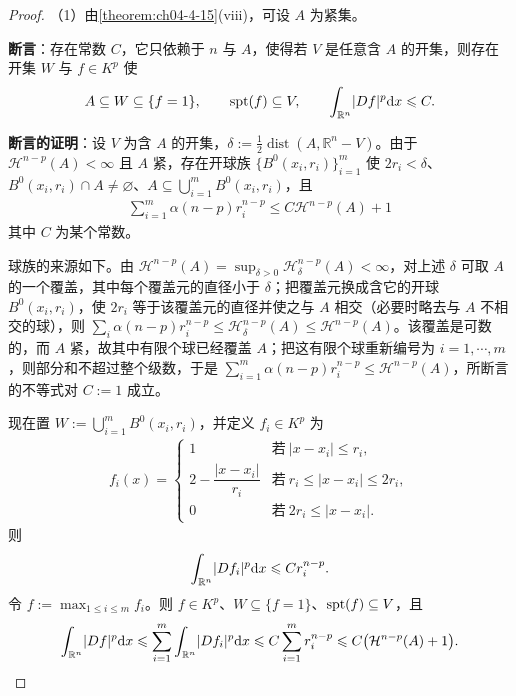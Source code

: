 \documentclass[../../main.tex]{subfiles}%
\begin{document}
\begin{proof}
（1）由\cref{theorem:ch04-4-15}(viii)，可设 $A$ 为紧集。%

\textbf{断言}：存在常数 $C$，它只依赖于 $n$ 与 $A$，使得若 $V$ 是任意含 $A$ 的开集，则存在开集 $W$ 与 $f\in K^p$ 使
\begin{align*}
A\subseteq W\subseteq\{f=1\},\qquad\operatorname{spt}(f)\subseteq V,\qquad\int_{\mathbb{R}^n}\lvert Df\rvert^p\mathrm{d} x\leqslant C .
\end{align*}

\textbf{断言的证明}：设 $V$ 为含 $A$ 的开集，$\delta:=\frac12\operatorname{dist}(A,\mathbb{R}^n-V)$。由于 $\mathcal{H}^{n-p}(A)<\infty$ 且 $A$ 紧，存在开球族 $\{B^{0}(x_i,r_i)\}_{i=1}^m$ 使 $2r_i<\delta$、$B^{0}(x_i,r_i)\cap A\neq\varnothing$、$A\subseteq\bigcup_{i=1}^mB^{0}(x_i,r_i)$，且
\begin{align*}
\sum_{i=1}^m\alpha(n-p)r_i^{n-p}\leqslant C\mathcal{H}^{n-p}(A)+1
\end{align*}
其中 $C$ 为某个常数。

球族的来源如下。由 $\mathcal{H}^{n-p}(A)=\sup_{\delta>0}\mathcal{H}^{n-p}_{\delta}(A)<\infty$，对上述 $\delta$ 可取 $A$ 的一个覆盖，其中每个覆盖元的直径小于 $\delta$；把覆盖元换成含它的开球 $B^{0}(x_i,r_i)$，使 $2r_i$ 等于该覆盖元的直径并使之与 $A$ 相交（必要时略去与 $A$ 不相交的球），则 $\sum_i\alpha(n-p)r_i^{n-p}\leqslant\mathcal{H}^{n-p}_\delta(A)\leqslant\mathcal{H}^{n-p}(A)$。该覆盖是可数的，而 $A$ 紧，故其中有限个球已经覆盖 $A$；把这有限个球重新编号为 $i=1,\cdots,m$，则部分和不超过整个级数，于是 $\sum_{i=1}^m\alpha(n-p)r_i^{n-p}\leqslant\mathcal{H}^{n-p}(A)$，所断言的不等式对 $C:=1$ 成立。

现在置 $W:=\bigcup_{i=1}^mB^{0}(x_i,r_i)$，并定义 $f_i\in K^p$ 为
\begin{align*}
f_i(x)=
\begin{cases}
1 & \text{若}\ \lvert x-x_i\rvert\leqslant r_i,\\[2pt]
2-\dfrac{\lvert x-x_i\rvert}{r_i} & \text{若}\ r_i\leqslant\lvert x-x_i\rvert\leqslant2r_i,\\[2pt]
0 & \text{若}\ 2r_i\leqslant\lvert x-x_i\rvert .
\end{cases}
\end{align*}
则
\begin{align*}
\int_{\mathbb{R}^n}\lvert Df_i\rvert^p\mathrm{d} x\leqslant Cr_i^{n-p} .
\end{align*}
令 $f:=\max_{1\leqslant i\leqslant m}f_i$。则 $f\in K^p$、$W\subseteq\{f=1\}$、$\operatorname{spt}(f)\subseteq V$，且
\begin{align*}
\int_{\mathbb{R}^n}\lvert Df\rvert^p\mathrm{d} x\leqslant\sum_{i=1}^m\int_{\mathbb{R}^n}\lvert Df_i\rvert^p\mathrm{d} x\leqslant C\sum_{i=1}^m r_i^{n-p}\leqslant C\bigl(\mathcal{H}^{n-p}(A)+1\bigr).
\end{align*}


\end{proof}
\end{document}
